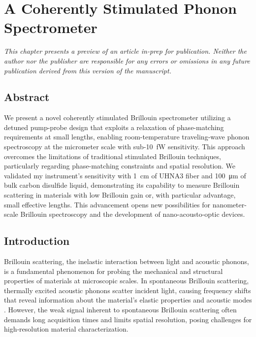 \setcounter{rownumber}{0}
\chapter{A Coherently Stimulated Phonon Spectrometer}
\label{ch:CoBS}
\acresetall

\hfill

\textit{This chapter presents a preview of an article in-prep for publication. Neither the author nor the publisher are responsible for any errors or omissions in any future publication derived from this version of the manuscript.}

\doublespacing

\section{Abstract}
We present a novel coherently stimulated Brillouin spectrometer utilizing a detuned pump-probe design that exploits a relaxation of phase-matching requirements at small lengths, enabling room-temperature traveling-wave phonon spectroscopy at the micrometer scale with sub-\SI{10}{\femto\watt} sensitivity. This approach overcomes the limitations of traditional stimulated Brillouin techniques, particularly regarding phase-matching constraints and spatial resolution. We validated my instrument’s sensitivity with \SI{1}{\centi\meter} of \ac{UHNA3} fiber and \SI{100}{\micro\meter} of bulk carbon disulfide liquid, demonstrating its capability to measure Brillouin scattering in materials with low Brillouin gain or, with particular advantage, small effective lengths. This advancement opens new possibilities for nanometer-scale Brillouin spectroscopy and the development of nano-acousto-optic devices.

\section{Introduction}
\label{sec:Introduction}

Brillouin scattering, the inelastic interaction between light and acoustic phonons, is a fundamental phenomenon for probing the mechanical and structural properties of materials at microscopic scales. In spontaneous Brillouin scattering, thermally excited acoustic phonons scatter incident light, causing frequency shifts that reveal information about the material’s elastic properties and acoustic modes \cite{boyd2020nonlinear}. However, the weak signal inherent to spontaneous Brillouin scattering often demands long acquisition times and limits spatial resolution, posing challenges for high‐resolution material characterization.

